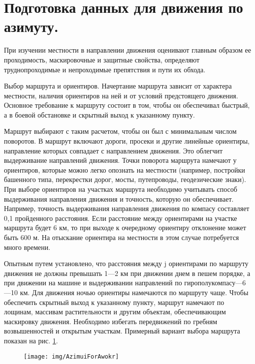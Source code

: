 \documentclass[12pt,a4paper]{report}
\begin{document}
\section{Подготовка данных для движения по азимуту.}
При изучении местности в направлении движения оценивают главным образом ее проходимость, маскировочные и защитные свойства, определяют труднопроходимые и непроходимые препятствия и пути их обхода.

Выбор маршрута и ориентиров. Начертание маршрута зависит от характера местности, наличия ориентиров на ней и от условий предстоящего движения. Основное требование к маршруту состоит в том, чтобы он обеспечивал быстрый, а в боевой обстановке и скрытный выход к указанному пункту.

Маршрут выбирают с таким расчетом, чтобы он был с минимальным числом поворотов. В маршрут включают дороги, просеки и другие линейные ориентиры, направление которых совпадает с направлением движения. Это облегчит выдерживание направлений движения. Точки поворота маршрута намечают у ориентиров, которые можно легко опознать на местности (например, постройки башенного типа, перекрестки дорог, мосты, путепроводы, геодезические знаки).
При выборе ориентиров на участках маршрута необходимо учитывать способ выдерживания направления движения и точность, которую он обеспечивает. Например, точность выдерживания направления движения по компасу составляет 0,1 пройденного расстояния. Если расстояние между ориентирами на участке маршрута будет 6 км, то при выходе к очередному ориентиру отклонение может быть 600 м. На отыскание ориентира на местности в этом случае потребуется много времени.

Опытным путем установлено, что расстояния между j ориентирами по маршруту движения не должны превышать 1—2 км при движении днем в пешем порядке, а при движении на машине и выдерживании направлений по гирополукомпасу—6—10 км. Для движения ночью ориентиры намечаются по маршруту чаще. Чтобы обеспечить скрытный выход к указанному пункту, маршрут намечают по лощинам, массивам растительности и другим объектам, обеспечивающим маскировку движения. Необходимо избегать передвижений по гребням возвышенностей и открытым участкам. Примерный вариант выбора маршрута показан на рис. \ref{fig:AzimuiForAwokr}.
\begin{figure}[h]
\centering
\texttt{[image: img/AzimuiForAwokr]}
\caption[Выбор маршрута для движения по азмимуту]{}
\label{fig:AzimuiForAwokr}
\end{figure}
\end{document}
